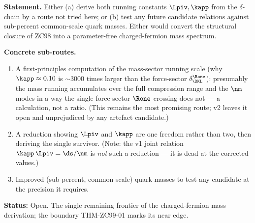 \documentclass[12pt, a4paper]{article}
\begin{document}
\begin{openqbox}[title={GAP-ZC99-01: Cross the Boundary
  (Priority 1 --- the charged-fermion mass frontier)}]
\textbf{Statement.} Either (a) derive both running constants $\Lpiv,\kapp$ from
the $\delta$-chain by a route not tried here; or (b) test any future candidate
relations against sub-percent common-scale quark masses. Either would convert
the structural closure of ZC98 into a parameter-free charged-fermion mass
spectrum.

\textbf{Concrete sub-routes.}
\begin{enumerate}[leftmargin=1.8em, noitemsep]
  \item A first-principles computation of the mass-sector running scale (why
    $\kapp\approx0.10$ is $\sim3000$ times larger than the force-sector
    $\delta_{\DKL}^{\Rone}$): presumably the mass running accumulates over the
    full compression range and the $\nm$ modes in a way the single force-sector
    $\Rone$ crossing does not --- a calculation, not a ratio. (This remains the
    most promising route; v2 leaves it open and unprejudiced by any artefact
    candidate.)
  \item A reduction showing $\Lpiv$ and $\kapp$ are one freedom rather than two,
    then deriving the single survivor. (Note: the v1 joint relation
    $\kapp\,\Lpiv=\ds/\nm$ is \emph{not} such a reduction --- it is dead at the
    corrected values.)
  \item Improved (sub-percent, common-scale) quark masses to test any candidate
    at the precision it requires.
\end{enumerate}
\textbf{Status:} Open. The single remaining frontier of the charged-fermion
mass derivation; the boundary THM-ZC99-01 marks its near edge.
\end{openqbox}
\end{document}
